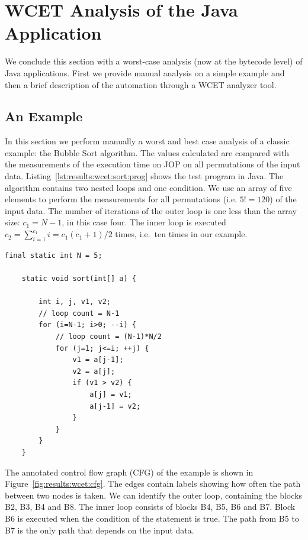 \section{WCET Analysis of the Java Application}


We conclude this section with a worst-case analysis (now at the
bytecode level) of Java applications. First we provide manual
analysis on a simple example and then a brief description of the
automation through a WCET analyzer tool.

\subsection{An Example} \label{subsec:wcet:eval}


In this section we perform manually a worst and best case analysis of
a classic example: the Bubble Sort algorithm. The values calculated
are compared with the measurements of the execution time on JOP on
all permutations of the input data.
Listing~\ref{lst:results:wcet:sort:prog} shows the test program in
Java. The algorithm contains two nested loops and one condition. We
use an array of five elements to perform the measurements for all
permutations (i.e. $5!=120$) of the input data. The number of
iterations of the outer loop is one less than the array size:
$c_1=N-1$, in this case four. The inner loop is executed $c_2 =
\sum_{i=1}^{c_1}i = c_1(c_1+1)/2$ times, i.e.\ ten times in our
example.


\begin{lstlisting}[float,caption={Bubble Sort test program for the WCET analysis},
label=lst:results:wcet:sort:prog]
    final static int N = 5;

    static void sort(int[] a) {

        int i, j, v1, v2;
        // loop count = N-1
        for (i=N-1; i>0; --i) {
            // loop count = (N-1)*N/2
            for (j=1; j<=i; ++j) {
                v1 = a[j-1];
                v2 = a[j];
                if (v1 > v2) {
                    a[j] = v1;
                    a[j-1] = v2;
                }
            }
        }
    }
\end{lstlisting}

The annotated control flow graph (CFG) of the example is shown in
Figure~\ref{fig:results:wcet:cfg}. The edges contain labels showing
how often the path between two nodes is taken. We can identify the
outer loop, containing the blocks B2, B3, B4 and B8. The inner loop
consists of blocks B4, B5, B6 and B7. Block B6 is executed when the
condition of the  statement is true. The path from B5 to B7
is the only path that depends on the input data.

